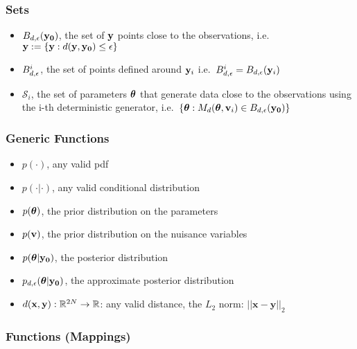 \subsubsection*{Sets}
\label{sec:sets}

\begin{itemize}
\item $B_{d,\epsilon}(\mathbf{y_0})$, the set of $\mathbf{y}$ points close to the
  observations, i.e.\ $\mathbf{y} := \{\mathbf{y}: d(\mathbf{y}, \mathbf{y_0}) \leq \epsilon \}$
\item $B_{d,\epsilon}^i$, the set of points defined around $\mathbf{y}_i$ i.e.\
  $B_{d,\epsilon}^i = B_{d,\epsilon}(\mathbf{y}_i)$
\item $\mathcal{S}_i$, the set of parameters $\boldsymbol{\theta}$ that generate data close
  to the observations using the i-th deterministic generator, i.e.\
  $\{ \boldsymbol{\theta}: M_d(\boldsymbol{\theta}, \mathbf{v}_i) \in B_{d,\epsilon}(\mathbf{y_0}) \}$
\end{itemize}
    
\subsubsection*{Generic Functions}
\label{sec:generic-functions}

\begin{itemize}
\item $p(\cdot)$, any valid pdf
\item $p(\cdot | \cdot)$, any valid conditional distribution
\item $p(\boldsymbol{\theta})$, the prior distribution on the parameters
\item $p(\mathbf{v})$, the prior distribution on the nuisance variables
\item $p(\boldsymbol{\theta}|\mathbf{y_0})$, the posterior distribution
\item $p_{d,\epsilon}(\boldsymbol{\theta}|\mathbf{y_0})$, the approximate posterior
  distribution  
\item $d(\mathbf{x}, \mathbf{y}): \mathbb{R}^{2N} \rightarrow \mathbb{R}$: any valid
  distance, the $L_2$ norm: $||\mathbf{x}-\mathbf{y}||_2$
\end{itemize}

\subsubsection*{Functions (Mappings)}
\label{sec:functions-mappings}

